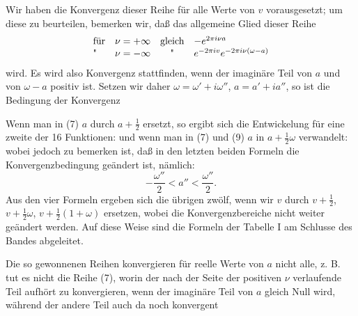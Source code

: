 Wir haben die Konvergenz dieser Reihe für alle Werte von $v$
vorausgesetzt; um diese zu beurteilen, bemerken wir, daß das allgemeine
 Glied dieser Reihe
\[
\begin{array}{lccl}
\text{für} & \nu = +\infty & \text{gleich} & -e^{2\pi i\nu a}\\
\text{\textquotedbl} & \nu = -\infty & \text{\textquotedbl} & e^{-2\pi iv}e^{-2\pi i\nu(\omega-a)}
\end{array}
\]
wird. Es wird also Konvergenz stattfinden, wenn der imaginäre
Teil von $a$ und von $\omega - a$ positiv ist. Setzen wir daher
$\omega = \omega' + i\omega''$, $a = a' + ia''$, so ist die Bedingung der Konvergenz

Wenn man in (7) $a$ durch $a + \frac{1}{2}$ ersetzt, so ergibt sich die
Entwickelung für eine zweite der 16 Funktionen:
und wenn man in (7) und (9) $a$ in $a + \frac{1}{2}\omega$ verwandelt:
wobei jedoch zu bemerken ist, daß in den letzten beiden Formeln
die Konvergenzbedingung geändert ist, nämlich:
\[
-\frac{\omega''}{2} < a'' < \frac{\omega''}{2}.
\]
Aus den vier Formeln ergeben sich die übrigen zwölf, wenn
wir $v$ durch $v + \frac{1}{2}$, $v + \frac{1}{2}\omega$, $v + \frac{1}{2}(1+\omega)$ ersetzen, wobei die
Konvergenzbereiche nicht weiter geändert werden. Auf diese Weise
sind die Formeln der Tabelle I am Schlusse des Bandes abgeleitet.

Die so gewonnenen Reihen konvergieren für reelle Werte
von $a$ nicht alle, z. B. tut es nicht die Reihe (7), worin der nach
der Seite der positiven $\nu$ verlaufende Teil
aufhört zu konvergieren, wenn der imaginäre Teil von $a$ gleich
Null wird, während der andere Teil auch da noch konvergent
